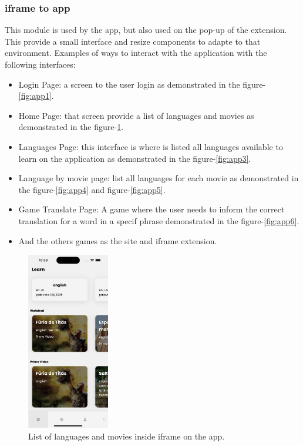 \documentclass[12pt]{article}
\begin{document}
\subsubsection{iframe to app}
This module is used by the app, but also used on the pop-up of the extension. This provide a small interface and resize components to adapte to that environment. Examples of ways to interact with the application with the following interfaces:
\begin{itemize}
  \item Login Page: a screen to the user login as demonstrated in the figure-\ref{fig:app1}.
  \item Home Page:  that screen provide a list of languages and movies as demonstrated in the figure-\ref{fig:app2}.
  \item Languages Page: this interface is where is listed all languages available to learn on the application as demonstrated in the figure-\ref{fig:app3}.
  \item Language by movie page: list all languages for each movie as demonstrated in the figure-\ref{fig:app4} and figure-\ref{fig:app5}.
  \item Game Translate Page: A game where the user needs to inform the correct translation for a word in a specif phrase demonstrated in the figure-\ref{fig:app6}.
  \item And the others games as the site and iframe extension. 
  \end{itemize}
  
 \begin{figure}[!h]
    \centering
    \caption{
     List of languages and movies inside iframe on the app.
    }
    \label{fig:app2}
    \includegraphics[width=0.32\textwidth]{assets/15.png}
  \end{figure}
  
\end{document}
